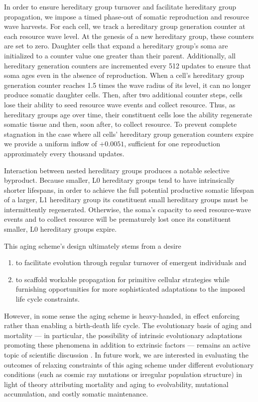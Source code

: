 In order to ensure hereditary group turnover and facilitate hereditary group propagation, we impose a timed phase-out of somatic reproduction and resource wave harvests.
For each cell, we track a hereditary group generation counter at each resource wave level.
At the genesis of a new hereditary group, these counters are set to zero.
Daughter cells that expand a hereditary group's soma are initialized to a counter value one greater than their parent.
Additionally, all hereditary generation counters are incremented every 512 updates to ensure that soma ages even in the absence of reproduction.
When a cell's hereditary group generation counter reaches 1.5 times the wave radius of its level, it can no longer produce somatic daughter cells.
Then, after two additional counter steps, cells lose their ability to seed resource wave events and collect resource.
Thus, as hereditary groups age over time, their constituent cells lose the ability regenerate somatic tissue and then, soon after, to collect resource.
To prevent complete stagnation in the case where all cells' hereditary group generation counters expire we provide a uniform inflow of $+0.0051$, sufficient for one reproduction approximately every thousand updates.

Interaction between nested hereditary groups produces a notable selective byproduct.
Because smaller, L0 hereditary groups tend to have intrinsically shorter lifespans, in order to achieve the full potential productive somatic lifespan of a larger, L1 hereditary group its constituent small hereditary groups must be intermittently regenerated.
Otherwise, the soma's capacity to seed resource-wave events and to collect resource will be prematurely lost once its constituent smaller, L0 hereditary groups expire.

This aging scheme's design ultimately stems from a desire
\begin{enumerate}
\item to facilitate evolution through regular turnover of emergent individuals and
\item to scaffold workable propagation for primitive cellular strategies while furnishing opportunities for more sophisticated adaptations to the imposed life cycle constraints.
\end{enumerate}
However, in some sense the aging scheme is heavy-handed, in effect enforcing rather than enabling a birth-death life cycle.
The evolutionary basis of aging and mortality --- in particular, the possibility of intrinsic evolutionary adaptations promoting these phenomena in addition to extrinsic factors  --- remains an active topic of scientific discussion \cite{baig2014evolution}.
In future work, we are interested in evaluating the outcomes of relaxing constraints of this aging scheme under different evolutionary conditions (such as cosmic ray mutations or irregular population structure) in light of theory attributing mortality and aging to evolvability, mutational accumulation, and costly somatic maintenance.

